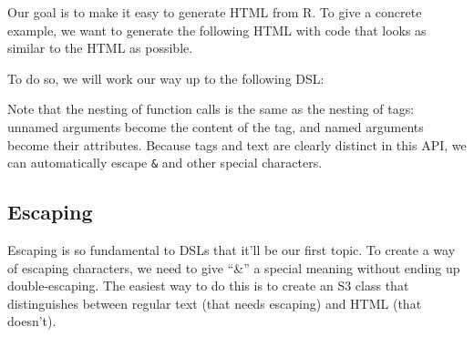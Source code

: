 Our goal is to make it easy to generate HTML from R. To give a concrete
example, we want to generate the following HTML with code that looks as
similar to the HTML as possible.

\begin{Shaded}
\begin{Highlighting}[]
  \KeywordTok{>}
   
   \KeywordTok{/>}
\end{Highlighting}
\end{Shaded}

To do so, we will work our way up to the following DSL:

\begin{Shaded}
\begin{Highlighting}[]
\NormalTok{(}\NormalTok{(}
  \NormalTok{(}\NormalTok{, } \NormalTok{),}
  \NormalTok{(}\NormalTok{, }\NormalTok{(}\NormalTok{)),}
  \NormalTok{(} \NormalTok{, } \NormalTok{, } \NormalTok{)}
\NormalTok{))}
\end{Highlighting}
\end{Shaded}

Note that the nesting of function calls is the same as the nesting of
tags: unnamed arguments become the content of the tag, and named
arguments become their attributes. Because tags and text are clearly
distinct in this API, we can automatically escape \texttt{\&} and other
special characters.

\hypertarget{escaping}{%
\subsection{Escaping}\label{escaping}}

Escaping is so fundamental to DSLs that it'll be our first topic. To
create a way of escaping characters, we need to give ``\&'' a special
meaning without ending up double-escaping. The easiest way to do this is
to create an S3 class that distinguishes between regular text (that
needs escaping) and HTML (that doesn't). 

